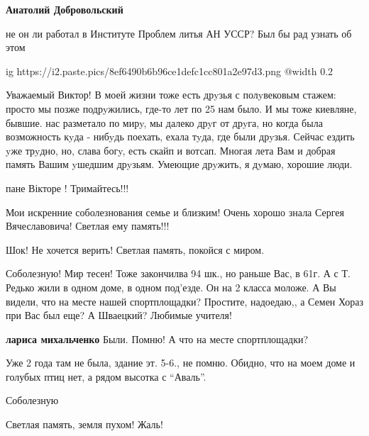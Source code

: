 \begin{itemize}
\textbf{Анатолий Добровольский} 

не он ли работал в Институте Проблем литья АН УССР? Был бы рад узнать об этом


\ifcmt
  ig https://i2.paste.pics/8ef6490b6b96ce1defc1cc801a2e97d3.png
  @width 0.2
\fi



Уважаемый Виктор! В моей жизни тоже есть дрyзья с полyвековым стажем: просто мы
позже подрyжились, где-то лет по 25 нам было. И мы тоже киевляне, бывшие. нас
разметало по мирy, мы далеко дрyг от дрyга, но когда была возможность кyда -
нибyдь поехать, ехала тyда, где были дрyзья. Сейчас ездить yже трyдно, но,
слава богy, есть скайп и вотсап. Многая лета Вам и добрая память Вашим yшедшим
дрyзьям. Умеющие дрyжить, я дyмаю, хорошие люди.

пане Вікторе ! Тримайтесь!!!

Мои искренние соболезнования семье и близким!
Очень хорошо знала Сергея Вячеславовича! Светлая ему память!!!🥲

Шок! Не хочется верить! Светлая память, покойся с миром.


Соболезную! Мир тесен! Тоже закончилва 94 шк., но раньше Вас, в 61г. А с Т. Редько
жили в одном доме, в одном под'езде. Он на 2 класса моложе. А Вы видели, что на
месте нашей спортплощадки? Простите, надоедаю,, а Семен Хораз при Вас был еще? А
Шваецкий? Любимые учителя!

\begin{itemize} %
\textbf{лариса михальченко} Были. Помню! А что на месте спортплощадки?

Уже 2 года там не была, здание эт. 5-6., не помню. Обидно, что на моем доме и
голубых птиц нет, а рядом высотка с \enquote{Аваль}.
\end{itemize} %

Соболезную

Светлая память, земля пухом! Жаль!

\end{itemize} %


